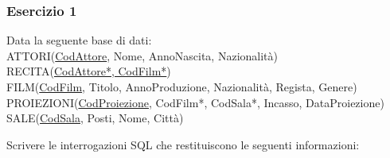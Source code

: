 \documentclass[a4paper]{article}
\begin{document}
\subsubsection{Esercizio 1}
Data la seguente base di dati:\medskip\\
ATTORI(\underline{CodAttore}, Nome, AnnoNascita, Nazionalità)\\
RECITA(\underline{CodAttore*, CodFilm*})\\
FILM(\underline{CodFilm}, Titolo, AnnoProduzione, Nazionalità, Regista, Genere)\\
PROIEZIONI(\underline{CodProiezione}, CodFilm*, CodSala*, Incasso, DataProiezione)\\
SALE(\underline{CodSala}, Posti, Nome, Città)\medskip\\\par Scrivere le interrogazioni SQL che restituiscono le seguenti informazioni:
\end{document}
